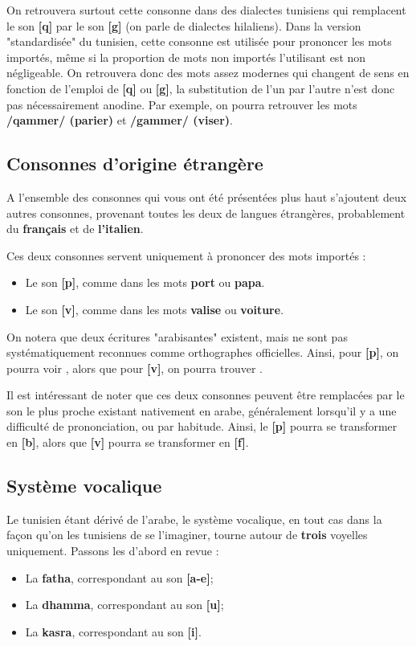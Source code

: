 On retrouvera surtout cette consonne dans des dialectes tunisiens qui remplacent le son \textbf{[q]} par le son \textbf{[g]} (on parle de dialectes hilaliens). Dans la version "standardisée" du tunisien, cette consonne est utilisée pour prononcer les mots importés, même si la proportion de mots non importés l'utilisant est non négligeable. On retrouvera donc des mots assez modernes qui changent de sens en fonction de l'emploi de \textbf{[q]} ou \textbf{[g]}, la substitution de l'un par l'autre n'est donc pas nécessairement anodine. Par exemple, on pourra retrouver les mots \textbf{/qammer/ (parier)} et \textbf{/gammer/ (viser)}.

\subsection{Consonnes d'origine étrangère}

A l'ensemble des consonnes qui vous ont été présentées plus haut s'ajoutent deux autres consonnes, provenant toutes les deux de langues étrangères, probablement du \textbf{français} et de \textbf{l'italien}.

Ces deux consonnes servent uniquement à prononcer des mots importés : 
\begin{itemize}
    \item Le son \textbf{[p]}, comme dans les mots \textbf{port} ou \textbf{papa}.
    \item Le son \textbf{[v]}, comme dans les mots \textbf{valise} ou \textbf{voiture}.
\end{itemize}

On notera que deux écritures "arabisantes" existent, mais ne sont pas systématiquement reconnues comme orthographes officielles. Ainsi, pour \textbf{[p]}, on pourra voir , alors que pour \textbf{[v]}, on pourra trouver .

Il est intéressant de noter que ces deux consonnes peuvent être remplacées par le son le plus proche existant nativement en arabe, généralement lorsqu'il y a une difficulté de prononciation, ou par habitude. Ainsi, le \textbf{[p]} pourra se transformer en \textbf{[b]}, alors que \textbf{[v]} pourra se transformer en \textbf{[f]}.

\subsection{Système vocalique}\label{Système vocalique}
Le tunisien étant dérivé de l'arabe, le système vocalique, en tout cas dans la façon qu'on les tunisiens de se l'imaginer, tourne autour de \textbf{trois} voyelles uniquement. Passons les d'abord en revue :
\begin{itemize}
    \item La \textbf{fatha}, correspondant au son \textbf{[a-e]};
    \item La \textbf{dhamma}, correspondant au son \textbf{[u]};
    \item La \textbf{kasra}, correspondant au son \textbf{[i]}.
\end{itemize}

